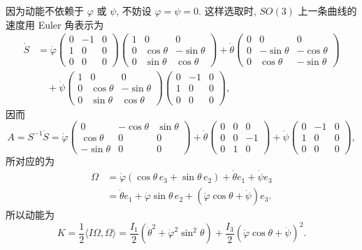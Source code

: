\begin{description}[font=\normalfont,leftmargin=2em,labelwidth=1.5em]
因为动能不依赖于 $\varphi$ 或 $\psi$, 不妨设 $\varphi=\psi=0$. 这样选取时, $SO(3)$ 上一条曲线的速度用 Euler 角表示为
\begin{align*}
  \dot S
  &=\dot\varphi\begin{pmatrix}0&-1&0\\1&0&0\\0&0&0\end{pmatrix}
     \begin{pmatrix}1&0&0\\0&\cos\theta&-\sin\theta\\0&\sin\theta&\cos\theta\end{pmatrix}
     +\dot\theta\begin{pmatrix}0&0&0\\0&-\sin\theta&-\cos\theta\\0&\cos\theta&-\sin\theta\end{pmatrix}\\
  &\quad+\dot\psi\begin{pmatrix}1&0&0\\0&\cos\theta&-\sin\theta\\0&\sin\theta&\cos\theta\end{pmatrix}
     \begin{pmatrix}0&-1&0\\1&0&0\\0&0&0\end{pmatrix},
\end{align*}
因而
\[
  A=S^{-1}\dot S=\dot\varphi\begin{pmatrix}0&-\cos\theta&\sin\theta\\
                   \cos\theta&0&0\\-\sin\theta&0&0\end{pmatrix}
   +\dot\theta\begin{pmatrix}0&0&0\\0&0&-1\\0&1&0\end{pmatrix}
   +\dot\psi\begin{pmatrix}0&-1&0\\1&0&0\\0&0&0\end{pmatrix},
\]
所对应的为
\begin{align*}
  \Omega&=\dot\varphi(\cos\theta\,e_3+\sin\theta\,e_2)+\dot\theta e_1+\dot\psi e_3\\
  &=\dot\theta e_1+\dot\varphi\sin\theta\,e_2+(\dot\varphi\cos\theta+\dot\psi)e_3.
\end{align*}
所以动能为
\[
  K=\frac12\langle I\Omega,\Omega\rangle
   =\frac{I_1}{2}(\dot\theta^2+\dot\varphi^2\sin^2\theta)
     +\frac{I_3}{2}(\dot\varphi\cos\theta+\dot\psi)^2.
\]


\end{description}
